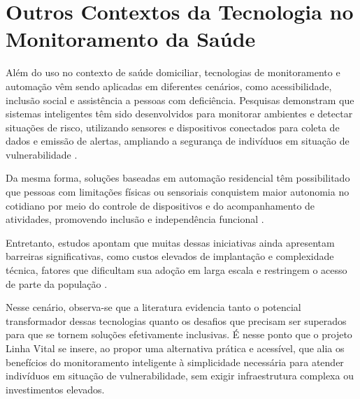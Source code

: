 \section{Outros Contextos da Tecnologia no Monitoramento da Saúde}

Além do uso no contexto de saúde domiciliar, tecnologias de monitoramento e automação vêm sendo aplicadas em diferentes cenários, como acessibilidade, inclusão social e assistência a pessoas com deficiência. Pesquisas demonstram que sistemas inteligentes têm sido desenvolvidos para monitorar ambientes e detectar situações de risco, utilizando sensores e dispositivos conectados para coleta de dados e emissão de alertas, ampliando a segurança de indivíduos em situação de vulnerabilidade \cite{reboucas2019}.

Da mesma forma, soluções baseadas em automação residencial têm possibilitado que pessoas com limitações físicas ou sensoriais conquistem maior autonomia no cotidiano por meio do controle de dispositivos e do acompanhamento de atividades, promovendo inclusão e independência funcional \cite{automacaoiot2019}.

Entretanto, estudos apontam que muitas dessas iniciativas ainda apresentam barreiras significativas, como custos elevados de implantação e complexidade técnica, fatores que dificultam sua adoção em larga escala e restringem o acesso de parte da população \cite{reboucas2019}.

Nesse cenário, observa-se que a literatura evidencia tanto o potencial transformador dessas tecnologias quanto os desafios que precisam ser superados para que se tornem soluções efetivamente inclusivas. É nesse ponto que o projeto Linha Vital se insere, ao propor uma alternativa prática e acessível, que alia os benefícios do monitoramento inteligente à simplicidade necessária para atender indivíduos em situação de vulnerabilidade, sem exigir infraestrutura complexa ou investimentos elevados.